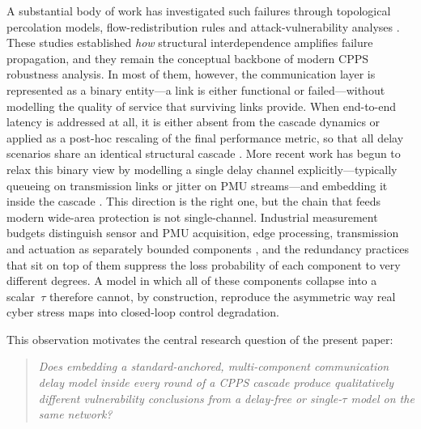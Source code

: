 A substantial body of work has investigated such failures through
topological percolation models, flow-redistribution rules and
attack-vulnerability analyses
\citep{Motter2002,Dobson2007,Brummitt2012,Schneider2011}.  These
studies established \emph{how} structural interdependence amplifies
failure propagation, and they remain the conceptual backbone of
modern CPPS robustness analysis.  In most of them, however, the
communication layer is represented as a binary entity---a link is
either functional or failed---without modelling the quality of
service that surviving links provide.  When end-to-end latency is
addressed at all, it is either absent from the cascade dynamics or
applied as a post-hoc rescaling of the final performance metric, so
that all delay scenarios share an identical structural cascade
\citep{Milano2012,LaiCPPS2019}.  More recent work has begun to
relax this binary view by modelling a single delay channel
explicitly---typically queueing on transmission links or jitter on
PMU streams---and embedding it inside the cascade
\citep{Cai2016TSG,Falahati2014TSG,Huang2015}.  This direction is the
right one, but the chain that feeds modern wide-area protection is
not single-channel.  Industrial measurement budgets distinguish
sensor and PMU acquisition, edge processing, transmission and
actuation as separately bounded components
\citep{NASPI_LatencyGuidelines,IEEE_C37_118_2}, and the redundancy
practices that sit on top of them
\citep{IEC_61850_PRP} suppress the loss probability of each
component to very different degrees.  A model in which all of these
components collapse into a scalar~$\tau$ therefore cannot, by
construction, reproduce the asymmetric way real cyber stress maps
into closed-loop control degradation.

This observation motivates the central research question of the
present paper:
\begin{quote}
\emph{Does embedding a standard-anchored, multi-component
communication delay model inside every round of a CPPS cascade
produce qualitatively different vulnerability conclusions from a
delay-free or single-$\tau$ model on the same network?}
\end{quote}

